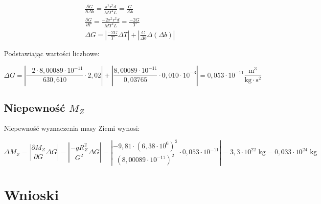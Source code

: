 \documentclass[a4paper,12pt]{article}
\begin{document}
\begin{align*}
     & \frac{\partial G}{\partial \Delta b} = \frac{\pi^2 r^2 d}{MT^2L} = \frac{G}{\Delta b} \\
     & \frac{\partial G}{\partial T} = \frac{-2\pi^2 r^2 d}{MT^3L} = \frac{-2G}{T}           \\
     & \Delta G = | \frac{-2G}{T} \Delta T | + | \frac{G}{\Delta b} \Delta( \Delta b ) |
\end{align*}

Podstawiając wartości liczbowe:

\begin{equation*}
    \Delta G = | \frac{-2 \cdot 8{,}00089 \cdot 10^{-11}}{630{,}610} \cdot 2{,}02 | + | \frac{8{,}00089 \cdot 10^{-11}}{0{,}03765} \cdot 0{,}010 \cdot 10^{-3} |
    = 0{,}053 \cdot 10^{-11} \frac{\text{m}^3}{\text{kg} \cdot \text{s}^2}
\end{equation*}

\subsection{Niepewność $M_Z$}

Niepewność wyznaczenia masy Ziemi wynosi:

$$
    \Delta M_Z = | \frac{\partial M_Z}{\partial G} \Delta G | = | \frac{-gR_Z^2}{G^{2}} \Delta G | = | \frac{-9{,}81 \cdot (6{,}38 \cdot 10^6)^2}{(8{,}00089 \cdot 10^{-11})^2} \cdot 0{,}053 \cdot 10^{-11} | = 3{,}3 \cdot 10^{22} \text{ kg} = 0{,}033 \cdot 10^{24} \text{ kg}
$$


\section{Wnioski}
\end{document}
